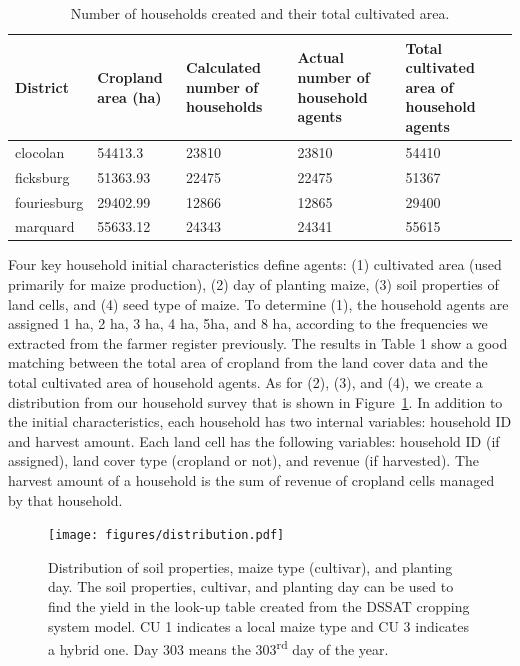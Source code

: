 \documentclass[11pt, titlepage]{article}
\begin{document}
\begin{table}[!ht] 
\centering 
\caption{Number of households created and their total cultivated area.} 
\centering
\begin{tabular}{p{2.5cm}|p{2cm}|p{3cm}|p{3cm}|p{3.5cm}} 
\hline District & Cropland area (ha) & Calculated number of households & Actual number of household agents & Total cultivated area of household agents \\
\hline 
clocolan & 54413.3 & 23810 & 23810 & 54410 \\ 
ficksburg & 51363.93 & 22475 & 22475 & 51367 \\ 
fouriesburg & 29402.99 & 12866 & 12865 & 29400 \\ 
marquard & 55633.12 & 24343 & 24341 & 55615 \\ 
\hline
\end{tabular} 
\label{tab:numOfHHs} 
\end{table}

Four key household initial characteristics define agents: (1) cultivated area (used primarily for maize production), (2) day of planting maize, (3) soil properties of land cells, and (4) seed type of maize. To determine (1), the household agents are assigned 1 ha, 2 ha, 3 ha, 4 ha, 5ha, and 8 ha, according to the frequencies we extracted from the farmer register previously. The results in Table 1 show a good matching between the total area of cropland from the land cover data and the total cultivated area of household agents. As for (2), (3), and (4), we create a distribution from our household survey that is shown in Figure~\ref{fig:distribution}. In addition to the initial characteristics, each household has two internal variables: household ID and harvest amount. Each land cell has the following variables: household ID (if assigned), land cover type (cropland or not), and revenue (if harvested). The harvest amount of a household is the sum of revenue of cropland cells managed by that household.

\begin{figure}[!ht] 
\centering 
\texttt{[image: figures/distribution.pdf]} 
\caption{Distribution of soil properties, maize type (cultivar), and planting day. The soil properties, cultivar, and planting day can be used to find the yield in the look-up table created from the DSSAT cropping system model. CU 1 indicates a local maize type and CU 3 indicates a hybrid one. Day 303 means the 303\textsuperscript{rd} day of the year.} %
\label{fig:distribution} \end{figure}
\end{document}
